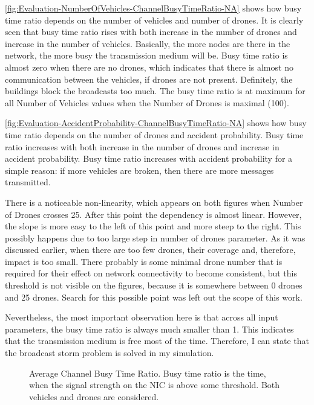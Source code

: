 \documentclass[]{nsm-thesis}
\begin{document}
\cref{fig:Evaluation-NumberOfVehicles-ChannelBusyTimeRatio-NA} shows how busy time ratio depends on the number of vehicles and number of drones. It is clearly seen that busy time ratio rises with both increase in the number of drones and increase in the number of vehicles. Basically, the more nodes are there in the network, the more busy the transmission medium will be. Busy time ratio is almost zero when there are no drones, which indicates that there is almost no communication between the vehicles, if drones are not present. Definitely, the buildings block the broadcasts too much. The busy time ratio is at maximum for all Number of Vehicles values when the Number of Drones is maximal (100).

\cref{fig:Evaluation-AccidentProbability-ChannelBusyTimeRatio-NA} shows how busy time ratio depends on the number of drones and accident probability.
Busy time ratio increases with both increase in the number of drones and increase in accident probability. Busy time ratio increases with accident probability for a simple reason: if more vehicles are broken, then there are more messages transmitted.

There is a noticeable non-linearity, which appears on both figures when Number of Drones crosses 25. After this point the dependency is almost linear. However, the slope is more easy to the left of this point and more steep to the right. This possibly happens due to too large step in number of drones parameter. As it was discussed earlier, when there are too few drones, their coverage and, therefore, impact is too small. There probably is some minimal drone number that is required for their effect on network connectivity to become consistent, but this threshold is not visible on the figures, because it is somewhere between 0 drones and 25 drones. Search for this possible point was left out the scope of this work.

Nevertheless, the most important observation here is that across all input parameters, the busy time ratio is always much smaller than 1. This indicates that the transmission medium is free most of the time. Therefore, I can state that the broadcast storm problem is solved in my simulation.



\begin{figure}%
	\centering
	\hfill
	\hfill
	\caption{Average Channel Busy Time Ratio. Busy time ratio is the time, when the signal strength on the \ac{NIC} is above some threshold. Both vehicles and drones are considered.}%
	\label{fig:Evaluation-ChannelBusyTimeRatio}%
\end{figure}
\end{document}
